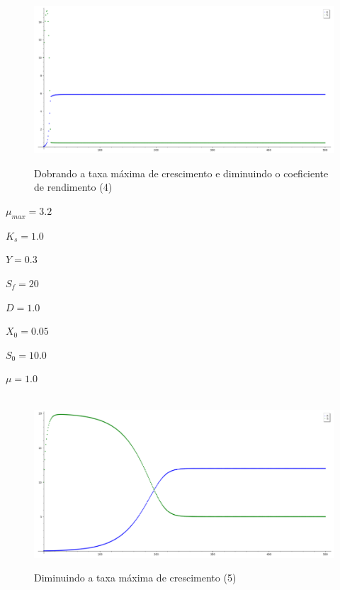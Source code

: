\documentclass{article}
\begin{document}
\begin{figure}[H]
        \centering
        \hbox{\hspace{1.0em} \includegraphics[scale=0.5]{Modelo_4.png}} 
        \caption*{Dobrando a taxa máxima de crescimento e diminuindo o coeficiente de rendimento (4)}
\end{figure}
\vspace{-7mm}
\begin{itemize}
\begin{multicols}{4}
    \item $\mu_{max} = 3.2$ 
    \item $K_s = 1.0$ 
\columnbreak    
    \item $Y = 0.3$ 
    \item $S_f = 20$ 
\columnbreak    
    \item $D = 1.0$ 
    \item $X_0 = 0.05$ 
\columnbreak    
    \item $S_0 = 10.0$ 
    \item $\mu = 1.0$
\end{multicols}
\end{itemize} 
\begin{figure}[H]
        \centering
        \hbox{\hspace{1.0em} \includegraphics[scale=0.5]{Modelo_5_New.png}} 
        \caption*{Diminuindo a taxa máxima de crescimento (5)}
\end{figure}
\end{document}
